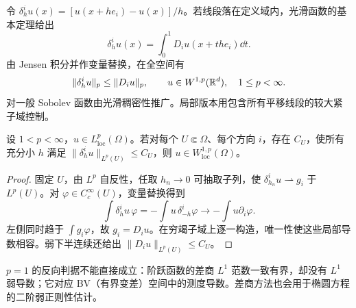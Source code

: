 令 $\delta_h^iu(x)=[u(x+he_i)-u(x)]/h$。若线段落在定义域内，光滑函数的基本定理给出
\[
 \delta_h^iu(x)=\int_0^1D_i u(x+the_i)\dd t.
\]
由 Jensen 积分并作变量替换，在全空间有
\begin{equation}
 \|\delta_h^iu\|_p\le\|D_i u\|_p,
 \qquad u\in W^{1,p}(\mathbb R^d),\quad1\le p<\infty.
 \label{eq:weak-difference-bound}
\end{equation}
对一般 Sobolev 函数由光滑稠密性推广。局部版本用包含所有平移线段的较大紧子域控制。

\begin{theorem}[局部差商的反向判据]\label{thm:weak-difference}
设 $1<p<\infty$，$u\in L^p_{\mathrm{loc}}(\Omega)$。若对每个 $U\Subset\Omega$、每个方向 $i$，存在 $C_U$，使所有充分小 $h$ 满足 $\|\delta_h^iu\|_{L^p(U)}\le C_U$，则 $u\in W^{1,p}_{\mathrm{loc}}(\Omega)$。
\end{theorem}
\begin{proof}
固定 $U$，由 $L^p$ 自反性，任取 $h_n\to0$ 可抽取子列，使 $\delta_{h_n}^iu\rightharpoonup g_i$ 于 $L^p(U)$。对 $\varphi\in C_c^\infty(U)$，变量替换得到
\[
 \int\delta_h^iu\,\varphi
 =-\int u\,\delta_{-h}^i\varphi
 \longrightarrow-\int u\partial_i\varphi.
\]
左侧同时趋于 $\int g_i\varphi$，故 $g_i=D_i u$。在穷竭子域上逐一构造，唯一性使这些局部导数相容。弱下半连续还给出 $\|D_i u\|_{L^p(U)}\le C_U$。
\end{proof}

$p=1$ 的反向判据不能直接成立：阶跃函数的差商 $L^1$ 范数一致有界，却没有 $L^1$ 弱导数；它对应 BV（有界变差）空间中的测度导数。差商方法也会用于椭圆方程的二阶弱正则性估计。


